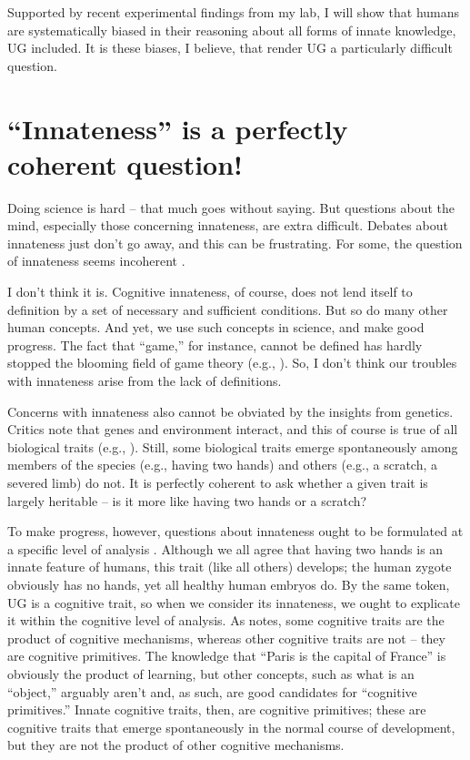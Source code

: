 \documentclass[output=paper,colorlinks,citecolor=brown
]{langscibook}
\begin{document}
Supported by recent experimental findings from my lab, I will show that humans are systematically biased in their reasoning about all forms of innate knowledge, UG included. It is these biases, I believe, that render UG a particularly difficult question.

\section{“Innateness” is a perfectly coherent question!}
Doing science is hard -- that much goes without saying. But questions about the mind, especially those concerning innateness, are extra difficult. Debates about innateness just don’t go away, and this can be frustrating. For some, the question of innateness seems incoherent \citep{mameli2011evaluation}. 

I don’t think it is. Cognitive innateness, of course, does not lend itself to definition by a set of necessary and sufficient conditions. But so do many other human concepts. And yet, we use such concepts in science, and make good progress. The fact that “game,” for instance, cannot be defined \citep{wittgenstein1953philosophical} has hardly stopped the blooming field of game theory (e.g., \cite{nowak1999evolution}).  So, I don’t think our troubles with innateness arise from the lack of definitions.\largerpage

Concerns with innateness also cannot be obviated by the insights from genetics. Critics note that genes and environment interact, and this of course is true of all biological traits (e.g., \cite{ridley2003nature}). Still, some biological traits emerge spontaneously among members of the species (e.g., having two hands) and others (e.g., a scratch, a severed limb) do not. It is perfectly coherent to ask whether a given trait is largely heritable -- is it more like having two hands or a scratch?

To make progress, however, questions about innateness ought to be formulated at a specific level of analysis \citep{samuels2004innateness}. Although we all agree that having two hands is an innate feature of humans, this trait (like all others) develops; the human zygote obviously has no hands, yet all healthy human embryos do. 
By the same token, UG is a cognitive trait, so when we consider its innateness, we ought to explicate it within the cognitive level of analysis. As \citet{samuels2004innateness} notes, some cognitive traits are the product of cognitive mechanisms, whereas other cognitive traits are not -- they are cognitive primitives. The knowledge that “Paris is the capital of France” is obviously the product of learning, but other concepts, such as what is an “object,” arguably aren’t and, as such, are good candidates for “cognitive primitives.” Innate cognitive traits, then, are cognitive primitives; these are cognitive traits that emerge spontaneously in the normal course of development, but they are not the product of other cognitive mechanisms.
\end{document}
